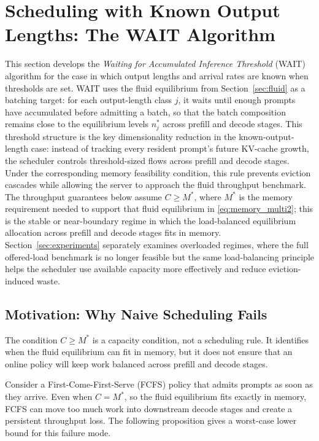 \section{Scheduling with Known Output Lengths: The WAIT Algorithm}
\label{sec:wait}

This section develops the \textit{Waiting for Accumulated Inference Threshold} (WAIT) algorithm for the case in which output lengths and arrival rates are known when thresholds are set. WAIT uses the fluid equilibrium from Section~\ref{sec:fluid} as a batching target: for each output-length class \(j\), it waits until enough prompts have accumulated before admitting a batch, so that the batch composition remains close to the equilibrium levels \(n_j^*\) across prefill and decode stages. This threshold structure is the key dimensionality reduction in the known-output-length case: instead of tracking every resident prompt's future KV-cache growth, the scheduler controls threshold-sized flows across prefill and decode stages. Under the corresponding memory feasibility condition, this rule prevents eviction cascades while allowing the server to approach the fluid throughput benchmark. The throughput guarantees below assume \(C \ge M^*\), where \(M^*\) is the memory requirement needed to support that fluid equilibrium in \eqref{eq:memory_multi2}; this is the stable or near-boundary regime in which the load-balanced equilibrium allocation across prefill and decode stages fits in memory. Section~\ref{sec:experiments} separately examines overloaded regimes, where the full offered-load benchmark is no longer feasible but the same load-balancing principle helps the scheduler use available capacity more effectively and reduce eviction-induced waste.

\subsection{Motivation: Why Naive Scheduling Fails}
\label{subsec:wait_motivation}

The condition \(C\ge M^*\) is a capacity condition, not a scheduling rule. It identifies when the fluid equilibrium can fit in memory, but it does not ensure that an online policy will keep work balanced across prefill and decode stages.

Consider a First-Come-First-Serve (FCFS) policy that admits prompts as soon as they arrive. Even when \(C=M^*\), so the fluid equilibrium fits exactly in memory, FCFS can move too much work into downstream decode stages and create a persistent throughput loss. The following proposition gives a worst-case lower bound for this failure mode.

